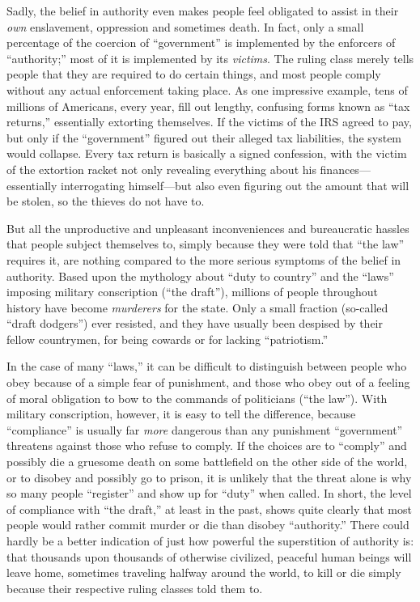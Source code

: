 \documentclass{book}
\begin{document}
Sadly, the belief in authority even makes people feel obligated to assist in their \emph{own} enslavement, oppression and sometimes death. In fact, only a small percentage of the coercion of \enquote{government} is implemented by the enforcers of \enquote{authority;} most of it is implemented by its \emph{victims}. The ruling class merely tells people that they are required to do certain things, and most people comply without any actual enforcement taking place. As one impressive example, tens of millions of Americans, every year, fill out lengthy, confusing forms known as \enquote{tax returns,} essentially extorting themselves. If the victims of the IRS agreed to pay, but only if the \enquote{government} figured out their alleged tax liabilities, the system would collapse. Every tax return is basically a signed confession, with the victim of the extortion racket not only revealing everything about his finances---essentially interrogating himself---but also even figuring out the amount that will be stolen, so the thieves do not have to.

But all the unproductive and unpleasant inconveniences and bureaucratic hassles that people subject themselves to, simply because they were told that \enquote{the law} requires it, are nothing compared to the more serious symptoms of the belief in authority. Based upon the mythology about \enquote{duty to country} and the \enquote{laws} imposing military conscription (\enquote{the draft}), millions of people throughout history have become \emph{murderers} for the state. Only a small fraction (so-called \enquote{draft dodgers}) ever resisted, and they have usually been despised by their fellow countrymen, for being cowards or for lacking \enquote{patriotism.}

In the case of many \enquote{laws,} it can be difficult to distinguish between people who obey because of a simple fear of punishment, and those who obey out of a feeling of moral obligation to bow to the commands of politicians (\enquote{the law}). With military conscription, however, it is easy to tell the difference, because \enquote{compliance} is usually far \emph{more} dangerous than any punishment \enquote{government} threatens against those who refuse to comply. If the choices are to \enquote{comply} and possibly die a gruesome death on some battlefield on the other side of the world, or to disobey and possibly go to prison, it is unlikely that the threat alone is why so many people \enquote{register} and show up for \enquote{duty} when called. In short, the level of compliance with \enquote{the draft,} at least in the past, shows quite clearly that most people would rather commit murder or die than disobey \enquote{authority.} There could hardly be a better indication of just how powerful the superstition of authority is: that thousands upon thousands of otherwise civilized, peaceful human beings will leave home, sometimes traveling halfway around the world, to kill or die simply because their respective ruling classes told them to.
\end{document}
